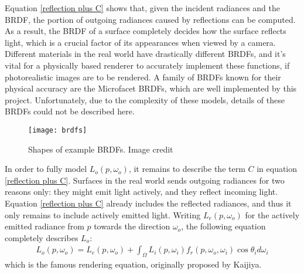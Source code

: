 Equation \ref{reflection plus C} shows that, given the incident radiances and the BRDF, the portion of outgoing radiances caused by reflections can be computed. As a result, the BRDF of a surface completely decides how the surface reflects light, which is a crucial factor of its appearances when viewed by a camera. Different materials in the real world have drastically different BRDFs, and it's vital for a physically based renderer to accurately implement these functions, if photorealistic images are to be rendered. A family of BRDFs known for their physical accuracy are the Microfacet BRDFs, which are well implemented by this project. Unfortunately, due to the complexity of these models, details of these BRDFs could not be described here. 
\begin{figure}[H]
    \centering
    \texttt{[image: brdfs]}
    \caption{Shapes of example BRDFs. Image credit\cite{akenine2019real}}
\end{figure}

In order to fully model $L_o(p,\omega_o)$, it remains to describe the term $C$ in equation \ref{reflection plus C}. Surfaces in the real world sends outgoing radiances for two reasons only: they might emit light actively, and they reflect incoming light. Equation \ref{reflection plus C} already includes the reflected radiances, and thus it only remains to include actively emitted light. Writing $L_e(p,\omega_o)$ for the actively emitted radiance from $p$ towards the direction $\omega_o$, the following equation completely describes $L_o$:
\begin{align}
    L_o(p,\omega_o) = L_e(p,\omega_o) + \int_\Omega L_i(p,\omega_i)f_r(p,\omega_o,\omega_i)\cos\theta_id\omega_i
    \label{rendering equation}
\end{align}
which is the famous rendering equation, originally proposed by Kaijiya\cite{rendering_equation}. 



